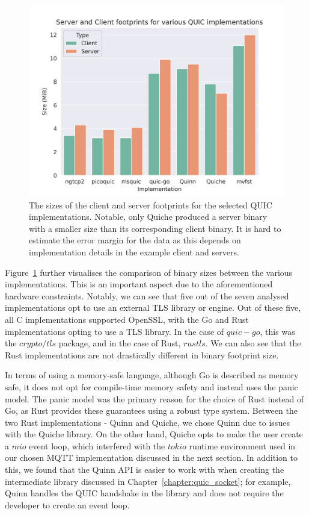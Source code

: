 \begin{figure}[ht]
    \centering
    \includegraphics[width=1\linewidth]{images/quic_impls.png}
    \caption{The sizes of the client and server footprints for the selected QUIC implementations. Notable, only Quiche produced a server binary with a smaller size than its corresponding client binary. It is hard to estimate the error margin for the data as this depends on implementation details in the example client and servers.}
    \label{fig:quic_impls}
\end{figure}

Figure~\ref{fig:quic_impls} further visualises the comparison of binary sizes between the various implementations.
This is an important aspect due to the aforementioned hardware constraints.
Notably, we can see that five out of the seven analysed implementations opt to use an external TLS library or engine.
Out of these five, all C implementations supported OpenSSL, with the Go and Rust implementations opting to use a TLS library.
In the case of $quic-go$, this was the $crypto/tls$ package, and in the case of Rust, $rustls$.
We can also see that the Rust implementations are not drastically different in binary footprint size.

In terms of using a memory-safe language, although Go is described as memory safe, it does not opt for compile-time memory safety and instead uses the panic model.
The panic model was the primary reason for the choice of Rust instead of Go, as Rust provides these guarantees using a robust type system.
Between the two Rust implementations - Quinn and Quiche, we chose Quinn due to issues with the Quiche library.
On the other hand, Quiche opts to make the user create a $mio$ event loop, which interfered with the $tokio$ runtime environment used in our chosen MQTT implementation discussed in the next section.
In addition to this, we found that the Quinn API is easier to work with when creating the intermediate library discussed in Chapter~\ref{chapter:quic_socket}; for example, Quinn handles the QUIC handshake in the library and does not require the developer to create an event loop.
